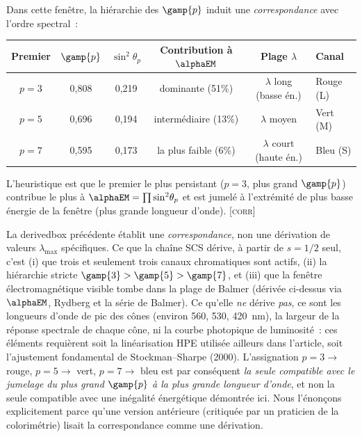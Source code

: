 \documentclass[12pt,a4paper]{article}
\begin{document}
\begin{derivedbox}
Dans cette fen\^etre, la hi\'erarchie des $\gamp{p}$ induit une
\emph{correspondance} avec l'ordre spectral~:
\begin{center}
\begin{tabular}{cccccl}
\toprule
Premier & $\gamp{p}$ & $\sin^2\!\theta_p$ & Contribution \`a $\alphaEM$ & Plage $\lambda$ & Canal \\
\midrule
$p = 3$ & 0{,}808 & 0{,}219 & dominante (51\%) & $\lambda$ long (basse \'en.) & Rouge (L) \\
$p = 5$ & 0{,}696 & 0{,}194 & interm\'ediaire (13\%) & $\lambda$ moyen & Vert (M) \\
$p = 7$ & 0{,}595 & 0{,}173 & la plus faible (6\%) & $\lambda$ court (haute \'en.) & Bleu (S) \\
\bottomrule
\end{tabular}
\end{center}

L'heuristique est que le premier le plus persistant ($p = 3$, plus
grand $\gamp{p}$) contribue le plus \`a
$\alphaEM = \prod \sin^2\!\theta_p$ et est jumel\'e \`a l'extr\'emit\'e
de plus basse \'energie de la fen\^etre (plus grande longueur d'onde).
\textsc{[corr]}
\end{derivedbox}

\begin{remark}
La derivedbox pr\'ec\'edente \'etablit une \emph{correspondance}, non
une d\'erivation de valeurs $\lambda_{\max}$ sp\'ecifiques. Ce que
la cha\^ine SCS d\'erive, \`a partir de $s = 1/2$ seul, c'est (i) que
trois et seulement trois canaux chromatiques sont actifs, (ii) la
hi\'erarchie stricte $\gamp{3} > \gamp{5} > \gamp{7}$, et (iii) que
la fen\^etre \'electromagn\'etique visible tombe dans la plage de
Balmer (d\'eriv\'ee ci-dessus via $\alphaEM$, Rydberg et la s\'erie de
Balmer). Ce qu'elle \emph{ne} d\'erive \emph{pas}, ce sont les
longueurs d'onde de pic des c\^ones (environ 560, 530, 420~nm), la
largeur de la r\'eponse spectrale de chaque c\^one, ni la courbe
photopique de luminosit\'e~: ces \'el\'ements requi\`erent soit la
lin\'earisation HPE utilis\'ee ailleurs dans l'article, soit
l'ajustement fondamental de Stockman--Sharpe (2000). L'assignation
$p = 3 \to$ rouge, $p = 5 \to$ vert, $p = 7 \to$ bleu est par
cons\'equent \emph{la seule compatible avec le jumelage du plus grand
$\gamp{p}$ \`a la plus grande longueur d'onde}, et non la seule
compatible avec une in\'egalit\'e \'energ\'etique d\'emontr\'ee ici.
Nous l'\'enon\c{c}ons explicitement parce qu'une version ant\'erieure
(critiqu\'ee par un praticien de la colorim\'etrie) lisait la
correspondance comme une d\'erivation.
\end{remark}
\end{document}
